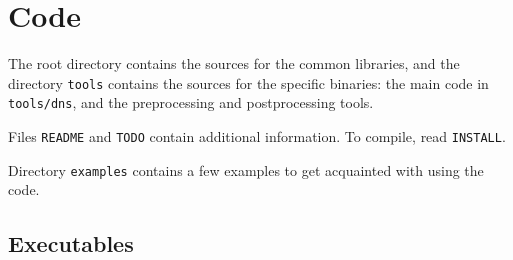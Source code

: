 \chapter{Code}\label{sec:code}


The root directory contains the sources for the common libraries, and the directory {\tt tools} contains the sources for the specific binaries: the main code in {\tt tools/dns}, and the preprocessing and postprocessing tools. %

Files {\tt README} and {\tt TODO} contain additional information. To compile, read {\tt INSTALL}.

Directory {\tt examples} contains a few examples to get acquainted with using the code.

\section{Executables}

